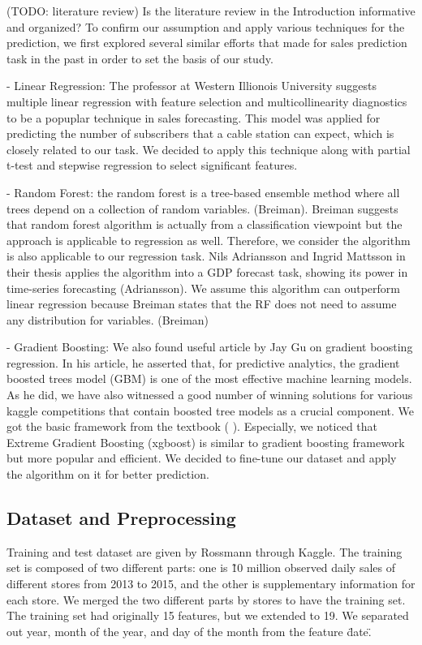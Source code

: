 \documentclass[letterpaper,twocolumn,10pt]{article}
\begin{document}
(TODO: literature review) Is the literature review in the Introduction informative and organized?
To confirm our assumption and apply various techniques for the prediction, we first explored several similar efforts that made for sales prediction task in the past in order to set the basis of our study. 

- Linear Regression: The professor at Western Illionois University suggests multiple linear regression with feature selection and multicollinearity diagnostics to be a popuplar technique in sales forecasting. This model was applied for predicting the number of subscribers that a cable station can expect, which is closely related to our task. We decided to apply this technique along with partial t-test and stepwise regression to select significant features. 

- Random Forest: the random forest is a tree-based ensemble method where all trees depend on a collection of random variables. (Breiman). Breiman suggests that random forest algorithm is actually from a classification viewpoint but the approach is
applicable to regression as well. Therefore, we consider the algorithm is also applicable to our regression task. Nils Adriansson and Ingrid Mattsson in their thesis applies the algorithm into a GDP forecast task, showing its power in time-series forecasting (Adriansson). We assume this algorithm can outperform linear regression because Breiman states that the RF does not need to assume any distribution for variables. (Breiman)

- Gradient Boosting: We also found useful article by Jay Gu on gradient boosting regression. In his article, he asserted that, for predictive analytics, the gradient boosted trees model (GBM) is one of the most effective machine learning models. As he did, we have also witnessed a good number of winning solutions for various kaggle competitions that contain boosted tree models as a crucial component. We got the basic framework from the textbook (    ). Especially, we noticed that Extreme Gradient Boosting (xgboost) is similar to gradient boosting framework but more popular and efficient. We decided to fine-tune our dataset and apply the algorithm on it for better prediction.


\subsection{Dataset and Preprocessing}
Training and test dataset are given by Rossmann through Kaggle. The training set is composed of two different parts: one is \~10 million observed daily sales of different stores from 2013 to 2015, and the other is supplementary information for each store. We merged the two different parts by stores to have the training set. The training set had originally 15 features, but we extended to 19. We separated out year, month of the year, and day of the month from the feature \"date\". 
\end{document}
